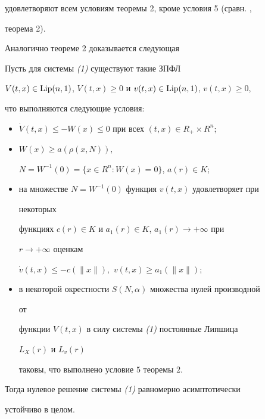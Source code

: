 удовлетворяют всем условиям теоремы 2, кроме условия 5 (сравн. \cite{Irt}, 


теорема 2). 


 


Аналогично теореме 2 доказывается следующая 


 




\begin{thm} Пусть для системы {\em (1)} существуют такие ЗПФЛ 


$V(t,x)\in\operatorname{Lip}(n,1)$, $V(t,x)\ge 0$ и $v(t,x)\in\operatorname{Lip}(n,1)$, $v(t,x)\ge 0$, 


что выполняются следующие условия: 


\begin{itemize} 


\item[1.] $\Dot V(t,x)\le -W(x)\le 0$ при всех $(t,x)\in R_+\times R^n;$ 


\item[2.] $W(x)\ge a(\rho(x,N)),$ 


$N=W^{-1}(0)=\{x\in R^n:W(x)=0\}$, $a(r)\in K;$ 


\item[3.] на множестве $N=W^{-1}(0)$ функция $v(t,x)$ удовлетворяет при 


некоторых 


функциях $c(r)\in K$ и $a_1(r)\in K$, $a_1(r)\to+\infty$ при 


$r\to+\infty$ оценкам 


$\Dot v(t,x)\le -c(\|x\|),$ $v(t,x)\ge a_1(\|x\|);$ 


\item[4.] в некоторой окрестности $S(N,\alpha)$ множества нулей производной 


от 


функции $V(t,x)$ в силу системы {\em (1)} постоянные Липшица


$L_X(r)$ и $L_v(r)$ 


таковы, что выполнено условие $5$ теоремы $2$. 


\end{itemize} 


 


Тогда нулевое решение системы {\em (1)} равномерно асимптотически 


устойчиво в целом. 


\end{thm} 


